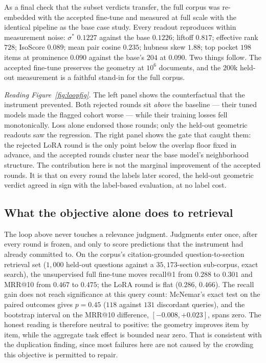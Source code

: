 \documentclass[11pt,letterpaper]{article}
\newcommand{\sstar}{\sigma^{*}}
\begin{document}
As a final check that the subset verdicts transfer, the full corpus was
re-embedded with the accepted fine-tune and measured at full scale with
the identical pipeline as the base case study. Every readout reproduces
within measurement noise: $\sstar$ $0.1227$ against the base $0.1226$;
liftoff $0.817$; effective rank $728$; IsoScore $0.089$; mean pair cosine
$0.235$; hubness skew $1.88$; top pocket $198$ items at prominence $0.090$
against the base's $204$ at $0.090$. Two things follow. The accepted
fine-tune preserves the geometry at $10^6$ documents, and the $200$k
held-out measurement is a faithful stand-in for the full corpus.

\emph{Reading Figure~\ref{fig:loopfig}.} The left panel shows the
counterfactual that the instrument prevented. Both rejected rounds sit
\emph{above} the baseline --- their tuned models made the flagged cohort
worse --- while their training losses fell monotonically. Loss alone
endorsed those rounds; only the held-out geometric readouts saw the
regression. The right panel shows the gate that caught them: the rejected
LoRA round is the only point below the overlap floor fixed in advance, and
the accepted rounds cluster near the base model's neighborhood structure.
The contribution here is not the marginal improvement of the accepted
rounds. It is that on every round the labels later scored, the held-out
geometric verdict agreed in sign with the label-based evaluation, at no
label cost.

\subsection{What the objective alone does to retrieval}
\label{sec:driving}

The loop above never touches a relevance judgment. Judgments enter once,
after every round is frozen, and only to score predictions that the
instrument had already committed to. On the corpus's citation-grounded
question-to-section retrieval set ($1{,}000$ held-out questions against a
$35{,}173$-section sub-corpus, exact search), the unsupervised full
fine-tune moves recall@1 from $0.288$ to $0.301$ and MRR@10 from $0.467$
to $0.475$; the LoRA round is flat ($0.286$, $0.466$). The recall gain
does not reach significance at this query count: McNemar's exact test on
the paired outcomes gives $p = 0.45$ ($118$ against $131$ discordant
queries), and the bootstrap interval on the MRR@10 difference, $[-0.008,
+0.023]$, spans zero. The honest reading is therefore neutral to positive:
the geometry improves item by item, while the aggregate task effect is
bounded near zero. That is consistent with the duplication finding, since
most failures here are not caused by the crowding this objective is
permitted to repair.
\end{document}
